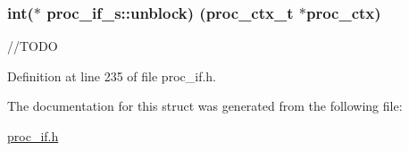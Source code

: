 \subsubsection[{\texorpdfstring{unblock}{unblock}}]{\setlength{\rightskip}{0pt plus 5cm}int($\ast$ proc\+\_\+if\+\_\+s\+::unblock) ({\bf proc\+\_\+ctx\+\_\+t} $\ast$proc\+\_\+ctx)}\hypertarget{structproc__if__s_a19d63c8db2cbfb227134f5a5bd5c8561}{}\label{structproc__if__s_a19d63c8db2cbfb227134f5a5bd5c8561}
//\+T\+O\+DO 

Definition at line 235 of file proc\+\_\+if.\+h.



The documentation for this struct was generated from the following file\+:\begin{DoxyCompactItemize}
\item 
\hyperlink{proc__if_8h}{proc\+\_\+if.\+h}\end{DoxyCompactItemize}
